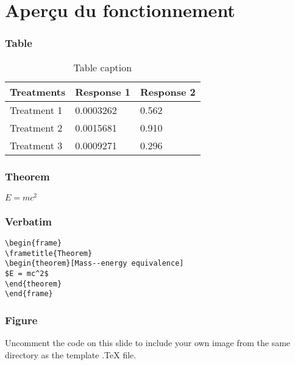 \documentclass{beamer}
\begin{document}
\section{Aperçu du fonctionnement}

\begin{frame}
\frametitle{Table}
\begin{table}
\begin{tabular}{l l l}
\toprule
\textbf{Treatments} & \textbf{Response 1} & \textbf{Response 2}\\
\midrule
Treatment 1 & 0.0003262 & 0.562 \\
Treatment 2 & 0.0015681 & 0.910 \\
Treatment 3 & 0.0009271 & 0.296 \\
\bottomrule
\end{tabular}
\caption{Table caption}
\end{table}
\end{frame}


\begin{frame}
\frametitle{Theorem}
\begin{theorem}
$E = mc^2$
\end{theorem}
\end{frame}


\begin{frame}[fragile] %
\frametitle{Verbatim}
\begin{example}
\begin{verbatim}
\begin{frame}
\frametitle{Theorem}
\begin{theorem}[Mass--energy equivalence]
$E = mc^2$
\end{theorem}
\end{frame}\end{verbatim}
\end{example}
\end{frame}


\begin{frame}
\frametitle{Figure}
Uncomment the code on this slide to include your own image from the same directory as the template .TeX file.
\end{frame}
\end{document}
